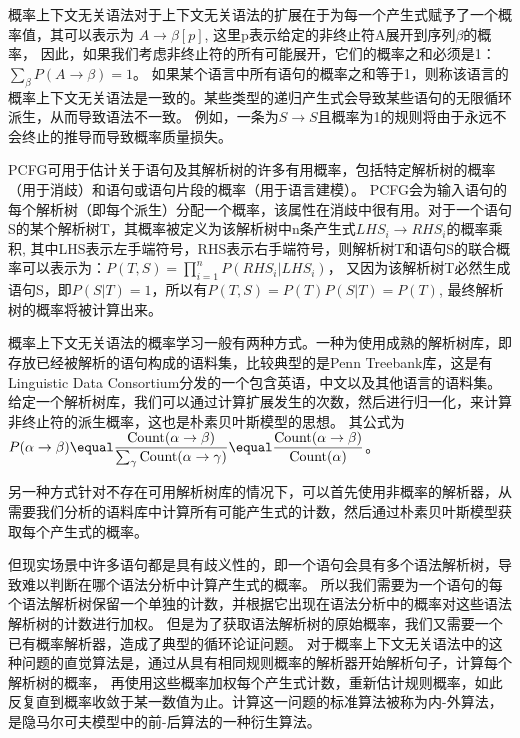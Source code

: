 概率上下文无关语法对于上下文无关语法的扩展在于为每一个产生式赋予了一个概率值，其可以表示为 $\displaystyle A \rightarrow \beta [p]$, 这里p表示给定的非终止符A展开到序列$\beta$的概率，
因此，如果我们考虑非终止符的所有可能展开，它们的概率之和必须是1：$\displaystyle \sum_\beta P(A \rightarrow \beta) \equal 1$。
如果某个语言中所有语句的概率之和等于1，则称该语言的概率上下文无关语法是一致的。某些类型的递归产生式会导致某些语句的无限循环派生，从而导致语法不一致。
例如，一条为$\displaystyle S \rightarrow S$且概率为1的规则将由于永远不会终止的推导而导致概率质量损失\cite{1672339}。

PCFG可用于估计关于语句及其解析树的许多有用概率，包括特定解析树的概率（用于消歧）和语句或语句片段的概率（用于语言建模）。
PCFG会为输入语句的每个解析树（即每个派生）分配一个概率，该属性在消歧中很有用。对于一个语句S的某个解析树T，其概率被定义为该解析树中n条产生式$\displaystyle LHS_i \rightarrow RHS_i$的概率乘积,
其中LHS表示左手端符号，RHS表示右手端符号，则解析树T和语句S的联合概率可以表示为：$\displaystyle P(T, S) = \prod_{i \equal 1}^{n} P(RHS_i|LHS_i)$，
又因为该解析树T必然生成语句S，即$\displaystyle P(S|T) \equal 1$，所以有$\displaystyle P(T, S) \equal P(T)P(S|T) \equal P(T)$, 最终解析树的概率将被计算出来。

概率上下文无关语法的概率学习一般有两种方式。一种为使用成熟的解析树库，即存放已经被解析的语句构成的语料集，比较典型的是Penn Treebank库\cite{Penn-Treebank}，这是有Linguistic Data
Consortium分发的一个包含英语，中文以及其他语言的语料集。给定一个解析树库，我们可以通过计算扩展发生的次数，然后进行归一化，来计算非终止符的派生概率，这也是朴素贝叶斯模型的思想。
其公式为$\displaystyle P(\alpha \rightarrow \beta) \equal \frac{\textup{Count}(\alpha \rightarrow \beta)}{\sum_{\gamma}\textup{Count}(\alpha \rightarrow \gamma)} \equal \frac{\textup{Count}(\alpha \rightarrow \beta)}{\textup{Count}(\alpha)}$。

另一种方式针对不存在可用解析树库的情况下，可以首先使用非概率的解析器，从需要我们分析的语料库中计算所有可能产生式的计数，然后通过朴素贝叶斯模型获取每个产生式的概率。

但现实场景中许多语句都是具有歧义性的，即一个语句会具有多个语法解析树，导致难以判断在哪个语法分析中计算产生式的概率。
所以我们需要为一个语句的每个语法解析树保留一个单独的计数，并根据它出现在语法分析中的概率对这些语法解析树的计数进行加权。
但是为了获取语法解析树的原始概率，我们又需要一个已有概率解析器，造成了典型的循环论证问题。
对于概率上下文无关语法中的这种问题的直觉算法是，通过从具有相同规则概率的解析器开始解析句子，计算每个解析树的概率，
再使用这些概率加权每个产生式计数，重新估计规则概率，如此反复直到概率收敛于某一数值为止。计算这一问题的标准算法被称为内-外算法，是隐马尔可夫模型中的前-后算法的一种衍生算法\cite{1979Trainable}。


